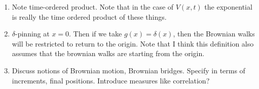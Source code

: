 \begin{enumerate}
    or in continuous language:
    \begin{equation}
      f(x,t)= \dlangle e^{-\int_0^t dt'  V[x+W(t')]}f_0[x+W(t)]\drangle
    \end{equation}
  \item Note time-ordered product.
    Note that in the case of $V(x,t)$ the exponential is really the time ordered product of these things.
  \item $\delta$-pinning at $x=0$.  
    Then if we take $g(x) = \delta(x)$, then the Brownian walks will be restricted to return to the origin.
    Note that I think this definition also assumes that the brownian walks are starting from the origin.  
  \item Discuss notions of Brownian motion, Brownian bridges.  Specify in terms of increments,
    final positions.  Introduce measures like correlation?




\end{enumerate}
